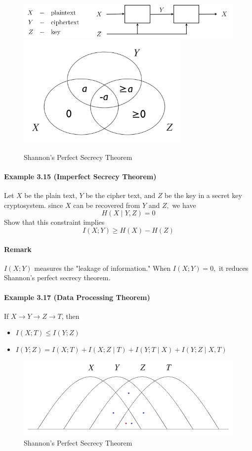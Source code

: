 \documentclass[8pt]{article}
\begin{document}
\begin{figure}[!t]
    \centering
    \includegraphics[width=0.5\linewidth]{imgs/exp3_15.png} \qquad
    \includegraphics[width=0.2\linewidth]{imgs/exp3_15_2.png}
    \caption{Shannon's Perfect Secrecy Theorem}
    \label{fig:my_label}
\end{figure}


\paragraph{Example 3.15 (Imperfect Secrecy Theorem)} Let $X$ be the plain text, $Y$ be the cipher text, and $Z$ be the key in a secret key cryptosystem. since $X$ can be recovered from $Y$ and $Z,$ we have
$$
H(X \mid Y, Z)=0
$$
Show that this constraint implies
$$
I(X ; Y) \geq H(X)-H(Z)
$$

\paragraph{Remark}
$I(X ; Y)$ measures the "leakage of information." When $I(X ; Y)=0,$ it reduces Shannon's perfect secrecy theorem.

\begin{tcolorbox}
\paragraph{Example 3.17 (Data Processing Theorem)} If $X \rightarrow Y \rightarrow Z \rightarrow T$, then
\begin{itemize}
    \item $I(X ; T) \leq I(Y ; Z)$
    \item $I(Y ; Z)=I(X ; T)+I(X ; Z \mid T)+I(Y ; T \mid X)+I(Y ; Z \mid X, T)$
\end{itemize}
\end{tcolorbox}

\begin{figure}[!h]
    \centering
    \includegraphics[width=0.5\linewidth]{imgs/exp3_17.png}
    \caption{Shannon's Perfect Secrecy Theorem}
    \label{fig:my_label}
\end{figure}
\end{document}
